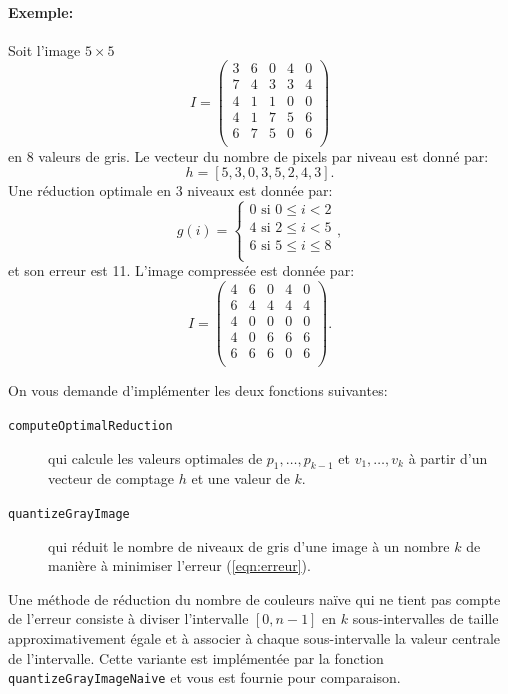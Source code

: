 \documentclass[a4paper,10pt]{article}
\begin{document}
\paragraph{Exemple:} Soit l'image $5\times 5$
$$I=\left(\begin{matrix}
     3 & 6 & 0 & 4 & 0\\
     7 & 4 & 3 & 3 & 4\\
     4 & 1 & 1 & 0 & 0\\
     4 & 1 & 7 & 5 & 6\\
     6 & 7 & 5 & 0 & 6\\
\end{matrix}\right)
$$
en 8 valeurs de gris. Le vecteur du nombre de pixels par niveau est donné par:
$$h=[5,3,0,3,5,2,4,3].$$ Une réduction optimale en 3 niveaux est donnée par:
\[g(i)=\left\{
\begin{array}{ll}
0\mbox{ si }0\leq i<2\\
4\mbox{ si }2\leq i < 5\\
6\mbox{ si }5\leq i\leq 8\\
\end{array}
\right.,
\]
et son erreur est 11. L'image compressée est donnée par:
$$
\hat{I}=\left(\begin{matrix}
  4 & 6 & 0 & 4 & 0\\
  6 & 4 & 4 & 4 & 4\\
  4 & 0 & 0 & 0 & 0\\
  4 & 0 & 6 & 6 & 6\\
  6 & 6 & 6 & 0 & 6\\
\end{matrix}\right).
$$


On vous demande d'implémenter les deux fonctions suivantes:
\begin{description}
\item[\texttt{computeOptimalReduction}] qui calcule les valeurs optimales de $p_1,\ldots,p_{k-1}$ et $v_1,\ldots,v_k$ à partir d'un vecteur de comptage $h$ et une valeur de $k$.
\item[\texttt{quantizeGrayImage}] qui réduit le nombre de niveaux de gris d'une image à un nombre $k$ de manière à minimiser l'erreur (\ref{eqn:erreur}).
\end{description}

Une méthode de réduction du nombre de couleurs naïve qui ne tient pas
compte de l'erreur consiste à diviser l'intervalle $[0,n-1]$ en $k$
sous-intervalles de taille approximativement égale et à associer à
chaque sous-intervalle la valeur centrale de l'intervalle. Cette
variante est implémentée par la fonction
\texttt{quantizeGrayImageNaive} et vous est fournie pour comparaison.
\end{document}
